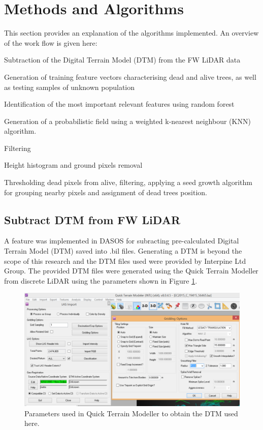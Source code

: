\documentclass{subfiles}
\begin{document}
\section{Methods and Algorithms}\label{sec:Methodology}

\par This section provides an explanation of the algorithms implemented. An overview of the work flow is given here: 
\begin{enumerate}
	\item Subtraction of the Digital Terrain Model (DTM) from the FW LiDAR data
	\item {\color{blue} Generation of training feature vectors characterising dead and alive trees, as well as testing samples of unknown population
	\item Identification of the most important relevant features using random forest}
	\item Generation of a probabilistic field using a weighted k-nearest neighbour (KNN) algorithm. 
	\item Filtering 
	\item Height histogram and ground pixels removal
	\item Thresholding dead pixels from alive, filtering, applying a seed growth algorithm for grouping nearby pixels and assignment of dead trees position.  
\end{enumerate}

\subsection{Subtract DTM from FW LiDAR}\label{sec:DTMsub}

\par A feature was implemented in DASOS for subracting pre-calculated Digital Terrain Model (DTM) saved into .bil files. Generating a DTM is beyond the scope of this research and the DTM files used were provided by Interpine Ltd Group. The provided DTM files were generated using the Quick Terrain Modeller from discrete LiDAR using the parameters shown in Figure \ref{fig:DTM_parameters}.

\begin{figure} [h!]
	\centering
	\includegraphics[width=\textwidth]{img/dead/DTM_parameters}
	\caption{Parameters used in Quick Terrain Modeller to obtain the DTM used here.}
	\label{fig:DTM_parameters}
\end{figure}
\end{document}
